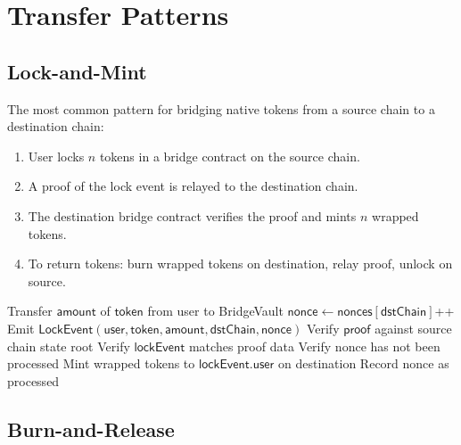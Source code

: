 \section{Transfer Patterns}
\label{sec:patterns}

\subsection{Lock-and-Mint}

The most common pattern for bridging native tokens from a source chain to a destination chain:

\begin{definition}
\begin{enumerate}
    \item User locks $n$ tokens in a bridge contract on the source chain.
    \item A proof of the lock event is relayed to the destination chain.
    \item The destination bridge contract verifies the proof and mints $n$ wrapped tokens.
    \item To return tokens: burn wrapped tokens on destination, relay proof, unlock on source.
\end{enumerate}
\end{definition}

\begin{algorithm}[H]
\caption{Lock-and-Mint Transfer Protocol}
\label{alg:lock_mint}
\begin{algorithmic}[1]
    \State Transfer $\mathsf{amount}$ of $\mathsf{token}$ from user to BridgeVault
    \State $\mathsf{nonce} \gets \mathsf{nonces}[\mathsf{dstChain}]$++
    \State Emit $\mathsf{LockEvent}(\mathsf{user}, \mathsf{token}, \mathsf{amount}, \mathsf{dstChain}, \mathsf{nonce})$
\EndProcedure
{}
    \State Verify $\mathsf{proof}$ against source chain state root
    \State Verify $\mathsf{lockEvent}$ matches proof data
    \State Verify nonce has not been processed
    \State Mint wrapped tokens to $\mathsf{lockEvent.user}$ on destination
    \State Record nonce as processed
\EndProcedure
\end{algorithmic}
\end{algorithm}

\subsection{Burn-and-Release}

